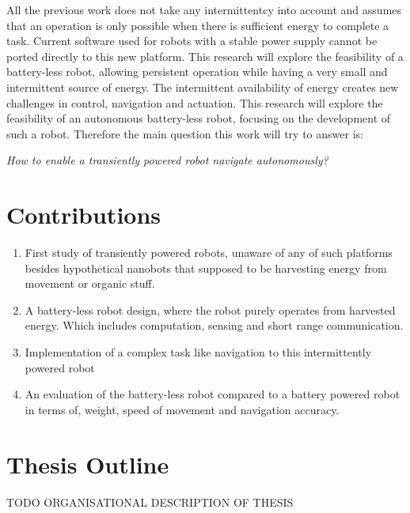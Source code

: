 
All the previous work does not take any intermittentcy into account and assumes that an operation is only possible when there is sufficient energy to complete a task.
Current software used for robots with a stable power supply cannot be ported directly to this new platform.
This research will explore the feasibility of a battery-less robot, allowing persistent operation while having a very small and intermittent source of energy.
The intermittent availability of energy creates new challenges in control, navigation and actuation. 
This research will explore the feasibility of an autonomous battery-less robot, focusing on the development of such a robot. Therefore the main question this work will try to answer is:

\begin{center}
	\textit{How to enable a transiently powered robot navigate autonomously?}
\end{center}

\section{Contributions}

\begin{enumerate}

\item First study of transiently powered robots, unaware of any of such platforms besides hypothetical nanobots that supposed to be harvesting energy from movement or organic stuff.

\item A battery-less robot design, where the robot purely operates from harvested energy. Which includes computation, sensing and short range communication.

\item Implementation of a complex task like navigation to this intermittently powered robot

\item An evaluation of the battery-less robot compared to a battery powered robot in terms of, weight, speed of movement and navigation accuracy.

% 

\end{enumerate}


\section{Thesis Outline}


\vspace{1\baselineskip}

\noindent
TODO ORGANISATIONAL DESCRIPTION OF THESIS

